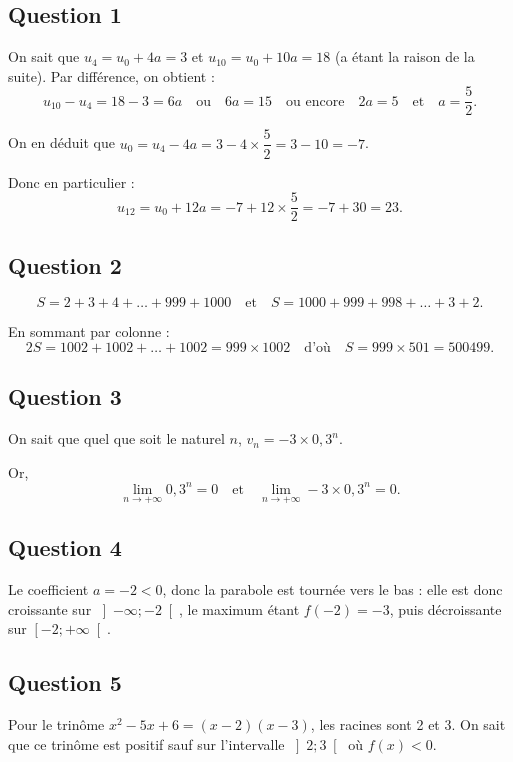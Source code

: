 \subsection*{Question 1}
	
	On sait que \(u_4 = u_0 + 4a = 3\) et \(u_{10} = u_0 + 10a = 18\) (a étant la raison de la suite). Par différence, on obtient :
	\[
	u_{10} - u_4 = 18 - 3 = 6a \quad \text{ou} \quad 6a = 15 \quad \text{ou encore} \quad 2a = 5 \quad \text{et} \quad a = \dfrac{5}{2}.
	\]
	
	On en déduit que \(u_0 = u_4 - 4a = 3 - 4 \times \dfrac{5}{2} = 3 - 10 = -7\).
	
	Donc en particulier :
	\[
	u_{12} = u_0 + 12a = -7 + 12 \times \dfrac{5}{2} = -7 + 30 = 23.
	\]
	
	\subsection*{Question 2}
	
	\[
	S = 2 + 3 + 4 + \ldots + 999 + 1000 \quad \text{et} \quad S = 1000 + 999 + 998 + \ldots + 3 + 2.
	\]
	
	En sommant par colonne :
	\[
	2S = 1002 + 1002 + \ldots + 1002 = 999 \times 1002 \quad \text{d’où} \quad S = 999 \times 501 = 500499.
	\]
	
	\subsection*{Question 3}
	
	On sait que quel que soit le naturel \(n\), \(v_n = -3 \times 0,3^n\).
	
	Or,
	\[
	\lim_{n \to +\infty} 0,3^n = 0 \quad \text{et} \quad \lim_{n \to +\infty} -3 \times 0,3^n = 0.
	\]
	
	\subsection*{Question 4}
	
	Le coefficient \(a = -2 < 0\), donc la parabole est tournée vers le bas : elle est donc croissante sur \(\left]-\infty ; -2\right[\), le maximum étant \(f(-2) = -3\), puis décroissante sur \(\left[-2 ; +\infty\right[\).
	
	\subsection*{Question 5}
	
	Pour le trinôme \(x^2 - 5x + 6 = (x - 2)(x - 3)\), les racines sont 2 et 3. On sait que ce trinôme est positif sauf sur l’intervalle \(\left]2 ; 3\right[\) où \(f(x) < 0\).
